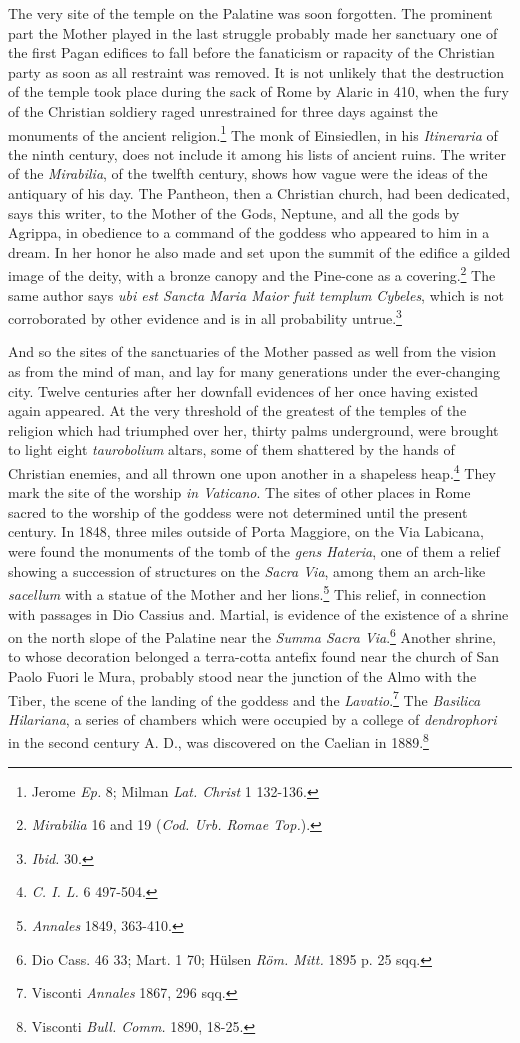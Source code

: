 \documentclass[a4paper, 11pt, oneside, polutonikogreek, english]{article}
\begin{document}
The very site of the temple on the Palatine was soon forgotten. The prominent part the Mother played in the last struggle probably made her sanctuary one of the first Pagan edifices to fall before the fanaticism or rapacity of the Christian party as soon as all restraint was removed. It is not unlikely that the destruction of the temple took place during the sack of Rome by Alaric in 410, when the fury of the Christian soldiery raged unrestrained for three days against the monuments of the ancient religion.\footnote{Jerome \emph{Ep.} 8; Milman \emph{Lat. Christ} 1 132-136.} The monk of Einsiedlen, in his \emph{Itineraria} of the ninth century, does not include it among his lists of ancient ruins. The writer of the \emph{Mirabilia}, of the twelfth century, shows how vague were the ideas of the antiquary of his day. The Pantheon, then a Christian church, had been dedicated, says this writer, to the Mother of the Gods, Neptune, and all the gods by Agrippa, in obedience to a command of the goddess who appeared to him in a dream. In her honor he also made and set upon the summit of the edifice a gilded image of the deity, with a bronze canopy and the Pine-cone as a covering.\footnote{\emph{Mirabilia} 16 and 19 (\emph{Cod. Urb. Romae Top.}).} The same author says \emph{ubi est Sancta Maria Maior fuit templum Cybeles}, which is not corroborated by other evidence and is in all probability untrue.\footnote{\emph{Ibid.} 30.}

And so the sites of the sanctuaries of the Mother passed as well from the vision as from the mind of man, and lay for many generations under the ever-changing city. Twelve centuries after her downfall evidences of her once having existed again appeared. At the very threshold of the greatest of the temples of the religion which had triumphed over her, thirty palms underground, were brought to light eight \emph{taurobolium} altars, some of them shattered by the hands of Christian enemies, and all thrown one upon another in a shapeless heap.\footnote{\emph{C. I. L.} 6 497-504.} They mark the site of the worship \emph{in Vaticano}. The sites of other places in Rome sacred to the worship of the goddess were not determined until the present century. In 1848, three miles outside of Porta Maggiore, on the Via Labicana, were found the monuments of the tomb of the \emph{gens Hateria}, one of them a relief showing a succession of structures on the \emph{Sacra Via}, among them an arch-like \emph{sacellum} with a statue of the Mother and her lions.\footnote{\emph{Annales} 1849, 363-410.} This relief, in connection with passages in Dio Cassius and. Martial, is evidence of the existence of a shrine on the north slope of the Palatine near the \emph{Summa Sacra Via}.\footnote{Dio Cass. 46 33; Mart. 1 70; Hülsen \emph{Röm. Mitt.} 1895 p. 25 sqq.} Another shrine, to whose decoration belonged a terra-cotta antefix found near the church of San Paolo Fuori le Mura, probably stood near the junction of the Almo with the Tiber, the scene of the landing of the goddess and the \emph{Lavatio}.\footnote{Visconti \emph{Annales} 1867, 296 sqq.} The \emph{Basilica Hilariana}, a series of chambers which were occupied by a college of \emph{dendrophori} in the second century A. D., was discovered on the Caelian in 1889.\footnote{Visconti \emph{Bull. Comm.} 1890, 18-25.}
\end{document}
